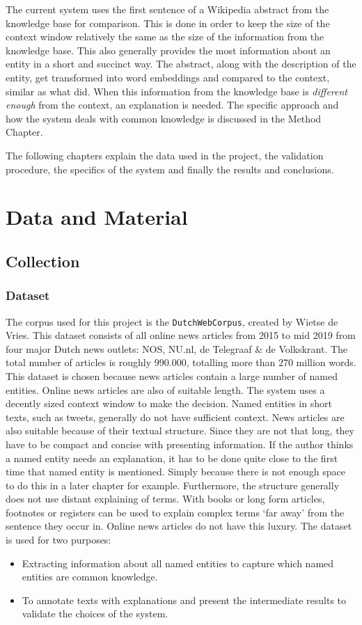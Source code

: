 \documentclass[
10pt, %
a4paper, %
oneside, %
headinclude,footinclude, %
] {book}%
\begin{document}
The current system uses the first sentence of a Wikipedia abstract from the knowledge base for comparison.
This is done in order to keep the size of the context window relatively the same as the size of the information from the knowledge base.
This also generally provides the most information about an entity in a short and succinct way.
The abstract, along with the description of the entity, get transformed into word embeddings and compared to the context, similar as what \citeauthor{vanhulst2020} did.
When this information from the knowledge base is \textit{different enough} from the context, an explanation is needed. The specific approach and how the system deals with common knowledge is discussed in the Method Chapter.

The following chapters explain the data used in the project, the validation procedure, the specifics of the system and finally the results and conclusions.

\chapter{Data and Material}
\section{Collection}
\subsection{Dataset}
The corpus used for this project is the \verb+DutchWebCorpus+, created by Wietse de Vries.
This dataset consists of all online news articles from 2015 to mid 2019 from four major
Dutch news outlets: NOS, NU.nl, de Telegraaf \& de Volkskrant. The total number of
articles is roughly 990.000, totalling more than 270 million words.
This dataset is chosen because news articles contain a large number of named entities.
Online news articles are also of suitable length.
The system uses a decently sized context window to make the decision.
Named entities in short texts, such as tweets, generally do not have sufficient context.
News articles are also suitable because of their textual structure.
Since they are not that long, they have to be compact and concise with presenting information.
If the author thinks a named entity needs an explanation, it has to be done quite close to the first time that named entity is mentioned.
Simply because there is not enough space to do this in a later chapter for example.
Furthermore, the structure generally does not use distant explaining of terms.
With books or long form articles, footnotes or registers can be used to explain complex terms `far away' from the sentence they occur in.
Online news articles do not have this luxury. The dataset is used for two purposes:
\begin{itemize}
  \item Extracting information about all named entities to capture which named entities are common knowledge.
  \item To annotate texts with explanations and present the intermediate results to validate the choices of the system.
\end{itemize}
\end{document}
